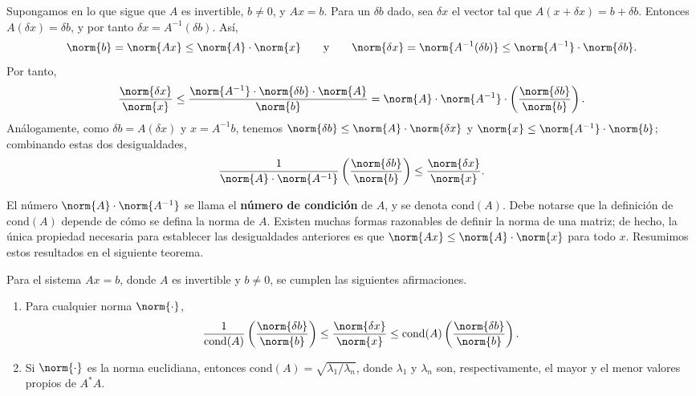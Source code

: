 Supongamos en lo que sigue que $A$ es invertible, $b\neq 0$, y $Ax=b$. Para un $\delta b$ dado, sea $\delta x$ el vector tal que $A(x+\delta x)=b+\delta b$. Entonces $A(\delta x)=\delta b$, y por tanto $\delta x=A^{-1}(\delta b)$. Así,
\begin{equation*}
    \norm{b}=\norm{Ax}\leq\norm{A}\cdot\norm{x}
    \qquad\text{y}\qquad
    \norm{\delta x}=\norm{A^{-1}(\delta b)}\leq\norm{A^{-1}}\cdot\norm{\delta b}.
\end{equation*}
Por tanto,
\begin{equation*}
    \frac{\norm{\delta x}}{\norm{x}}\leq\frac{\norm{A^{-1}}\cdot\norm{\delta b}\cdot\norm{A}}{\norm{b}}=\norm{A}\cdot\norm{A^{-1}}\cdot\left(\frac{\norm{\delta b}}{\norm{b}}\right).
\end{equation*}
Análogamente, como $\delta b=A(\delta x)$ y $x=A^{-1}b$, tenemos $\norm{\delta b}\leq\norm{A}\cdot\norm{\delta x}$ y $\norm{x}\leq\norm{A^{-1}}\cdot\norm{b}$; combinando estas dos desigualdades,
\begin{equation*}
    \frac{1}{\norm{A}\cdot\norm{A^{-1}}}\left(\frac{\norm{\delta b}}{\norm{b}}\right)\leq\frac{\norm{\delta x}}{\norm{x}}.
\end{equation*}

El número $\norm{A}\cdot\norm{A^{-1}}$ se llama el \textbf{número de condición} de $A$, y se denota $\mathrm{cond}(A)$. Debe notarse que la definición de $\mathrm{cond}(A)$ depende de cómo se defina la norma de $A$. Existen muchas formas razonables de definir la norma de una matriz; de hecho, la única propiedad necesaria para establecer las desigualdades anteriores es que $\norm{Ax}\leq\norm{A}\cdot\norm{x}$ para todo $x$. Resumimos estos resultados en el siguiente teorema.

\begin{teorema}
    Para el sistema $Ax=b$, donde $A$ es invertible y $b\neq 0$, se cumplen las siguientes afirmaciones.
    \begin{enumerate}[label=(\alph*)]
        \item Para cualquier norma $\norm{\cdot}$,
        \begin{equation*}
            \frac{1}{\mathrm{cond}(A)}\left(\frac{\norm{\delta b}}{\norm{b}}\right)\leq\frac{\norm{\delta x}}{\norm{x}}\leq\mathrm{cond}(A)\left(\frac{\norm{\delta b}}{\norm{b}}\right).
        \end{equation*}
        \item Si $\norm{\cdot}$ es la norma euclidiana, entonces $\mathrm{cond}(A)=\sqrt{\lambda_1/\lambda_n}$, donde $\lambda_1$ y $\lambda_n$ son, respectivamente, el mayor y el menor valores propios de $A^*A$.
    \end{enumerate}
\end{teorema}

